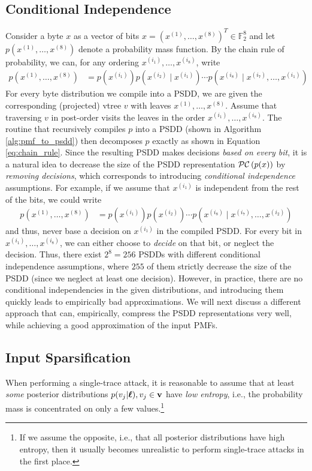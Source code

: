\subsection{Conditional Independence}
Consider a byte $x$ as a vector of bits $x = (x^{(1)},\dots,x^{(8)})^T \in \mathbb{F}_2^8$ and let $p(x^{(1)},\dots,x^{(8)})$ denote a probability mass function. By the chain rule of probability, we can, for any ordering $x^{(i_1)},\dots,x^{(i_8)}$, write
\begin{align}
    \label{eq:chain_rule}
p\left(x^{(1)},\dots,x^{(8)} \right) &= p \left( x^{(i_1)} \right) p \left( x^{(i_2)} \mid x^{(i_1)} \right) \cdots  p \left( x^{(i_8)} \mid x^{(i_7)}, \dots, x^{(i_1)} \right)
\end{align}
For every byte distribution we compile into a PSDD, we are given the corresponding (projected) vtree $v$ with leaves $x^{(1)},\dots,x^{(8)}$. Assume that traversing $v$ in post-order visits the leaves in the order $x^{(i_1)},\dots,x^{(i_8)}$. The routine that recursively compiles $p$ into a PSDD (shown in Algorithm \ref{alg:pmf_to_psdd}) then decomposes $p$ exactly as shown in Equation \ref{eq:chain_rule}. Since the resulting PSDD makes decisions \emph{based on every bit}, it is a natural idea to decrease the size of the PSDD representation $\mathcal{PC} \left( p(x) \right)$ by \emph{removing decisions}, which corresponds to introducing \emph{conditional independence} assumptions. For example, if we assume that $x^{(i_1)}$ is independent from the rest of the bits, we could write
\begin{align}
p\left(x^{(1)},\dots,x^{(8)} \right) &= p \left( x^{(i_1)} \right) p \left( x^{(i_2)} \right) \cdots  p \left( x^{(i_8)} \mid x^{(i_7)}, \dots, x^{(i_2)} \right)
\end{align}
and thus, never base a decision on $x^{(i_1)}$ in the compiled PSDD. For every bit in $x^{(i_1)},\dots,x^{(i_8)}$, we can either choose to \emph{decide} on that bit, or neglect the decision. Thus, there exist $2^8 = 256$ PSDDs with different conditional independence assumptions, where $255$ of them strictly decrease the size of the PSDD (since we neglect at least one decision).
However, in practice, there are no conditional independencies in the given distributions, and introducing them quickly leads to empirically bad approximations. We will next discuss a different approach that can, empirically, compress the PSDD representations very well, while achieving a good approximation of the input PMFs.

\subsection{Input Sparsification}
\label{sec:sparsification}
When performing a single-trace attack, it is reasonable to assume that at least \textit{some} posterior distributions $p(v_j | \boldsymbol{\ell}), v_j \in \mathbf{v}$ have \textit{low entropy}, i.e., the probability mass is concentrated on only a few values.\footnote{If we assume the opposite, i.e., that all posterior distributions have high entropy, then it usually becomes unrealistic to perform single-trace attacks in the first place.}

